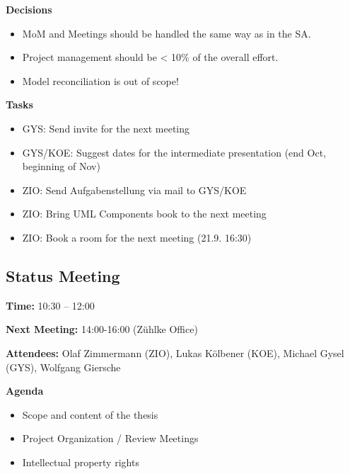 \textbf{Decisions}
\begin{itemize}
\item MoM and Meetings should be handled the same way as in the SA.
\item Project management should be < 10\% of the overall effort.
\item Model reconciliation is out of scope!
\end{itemize}

\textbf{Tasks}
\begin{itemize}
\item GYS: Send invite for the next meeting
\item GYS/KOE: Suggest dates for the intermediate presentation (end Oct, beginning of Nov)
\item ZIO: Send Aufgabenstellung via mail to GYS/KOE
\item ZIO: Bring UML Components book to the next meeting
\item ZIO: Book a room for the next meeting (21.9. 16:30)
\end{itemize}

\subsection{Status Meeting }

\textbf{Time:} 10:30 – 12:00
 
\textbf{Next Meeting:}  14:00-16:00 (Zühlke Office)
 
\textbf{Attendees:} Olaf Zimmermann (ZIO), Lukas Kölbener (KOE), Michael Gysel (GYS), Wolfgang Giersche
 
\textbf{Agenda}
\begin{itemize}
\item Scope and content of the thesis 
\item Project Organization / Review Meetings
\item Intellectual property rights
\end{itemize}

